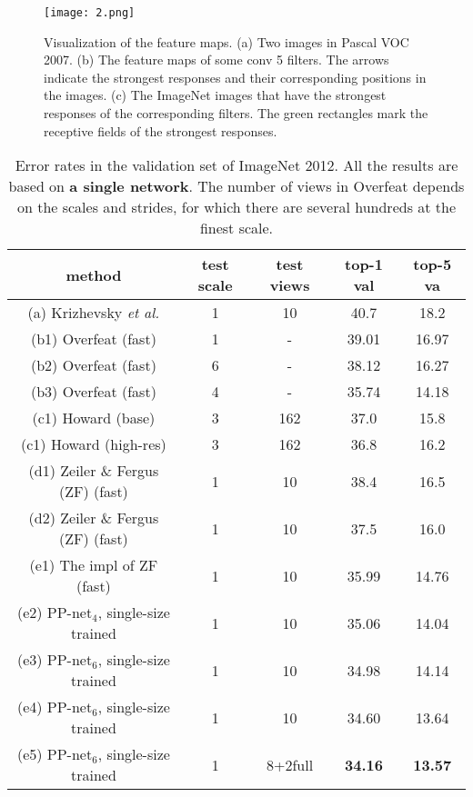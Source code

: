 \documentclass[10pt,twocolumn,letterpaper]{article}
\begin{document}
\begin{figure*}
\begin{center}
  \texttt{[image: 2.png]}\\
  \caption{Visualization of the feature maps. (a) Two images in Pascal VOC 2007. (b) The feature maps of some conv 5 filters. The arrows indicate the strongest responses and their corresponding positions in the images. (c) The ImageNet images that have the strongest responses
of the corresponding filters. The green rectangles mark the receptive fields of the strongest responses.}\label{2}
\end{center}
\end{figure*}
\par
\begin{table*}
\setlength{\abovecaptionskip}{0pt}
\setlength{\belowcaptionskip}{10pt}
\small
\renewcommand\arraystretch{1.2}
\centering
\begin{tabular}{|c|c|c|c|c|}
\hline
method & test scale & test views & top-1 val & top-5 va \\
\hline
(a) Krizhevsky \emph{et al.}\cite{Krizhevsky2012ImageNet} & 1 & 10 & 40.7 & 18.2 \\
\hline
(b1)  Overfeat (fast) \cite{Sermanet2013OverFeat} & 1 & - & 39.01 & 16.97 \\
(b2)  Overfeat (fast) \cite{Sermanet2013OverFeat} & 6 & - & 38.12 & 16.27 \\
(b3)  Overfeat (fast) \cite{Sermanet2013OverFeat} & 4 & - & 35.74 & 14.18 \\
\hline
(c1) Howard (base)\cite{Howard2013Some} & 3 & 162 & 37.0 & 15.8 \\
(c1) Howard (high-res)\cite{Howard2013Some} & 3 & 162 & 36.8 & 16.2 \\
\hline
(d1) Zeiler \& Fergus (ZF) (fast)\cite{Zeiler2014Visualizing} & 1 & 10 & 38.4 & 16.5 \\
(d2) Zeiler \& Fergus (ZF) (fast)\cite{Zeiler2014Visualizing} & 1 & 10 & 37.5 & 16.0 \\
\hline
(e1)  The impl of ZF (fast) & 1 & 10 & 35.99 & 14.76 \\
(e2)  PP-net$_4$, single-size trained & 1 & 10 & 35.06 & 14.04 \\
(e3)  PP-net$_6$, single-size trained & 1 & 10 & 34.98 & 14.14 \\
(e4)  PP-net$_6$, single-size trained & 1 & 10 & 34.60 & 13.64 \\
(e5)  PP-net$_6$, single-size trained & 1 & 8+2full & \textbf{34.16} & \textbf{13.57} \\
\hline
\end{tabular} 
\caption{Error rates in the validation set of ImageNet 2012. All the results are based on \textbf{a single network}. The number of views in Overfeat depends on the scales and strides, for which there are several hundreds at the finest scale.}
\label{tab1}
\end{table*}
\end{document}
